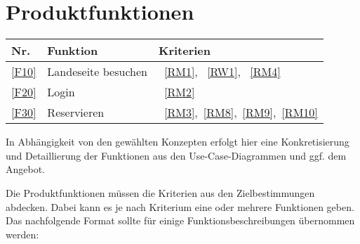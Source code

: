 

\chapter{Produktfunktionen}
\label{chap:product_functions}


\begin{table}[htbp]
    \centering
    \begin{tabularx}{\textwidth}{ l|X|>{\raggedright\arraybackslash}X }
        \textbf{Nr.} & \textbf{Funktion} & \textbf{Kriterien} \\ \hline\hline
        \ref{F10} & Landeseite besuchen &~\ref{RM1}, ~\ref{RW1}, ~\ref{RM4} \\
        \ref{F20} & Login &~\ref{RM2} \\
        \ref{F30} & Reservieren &~\ref{RM3},~\ref{RM8},~\ref{RM9},~\ref{RM10} \\
    \end{tabularx}
    \label{tab:functions}
\end{table}


\iffalse
In Abhängigkeit von den gewählten Konzepten erfolgt hier eine Konkretisierung
und Detaillierung der Funktionen aus den Use-Case-Diagrammen und ggf. dem
Angebot.

Die Produktfunktionen müssen die Kriterien aus den Zielbestimmungen abdecken.
Dabei kann es je nach Kriterium eine oder mehrere Funktionen geben.
Das nachfolgende Format sollte für einige Funktionsbeschreibungen übernommen werden:

